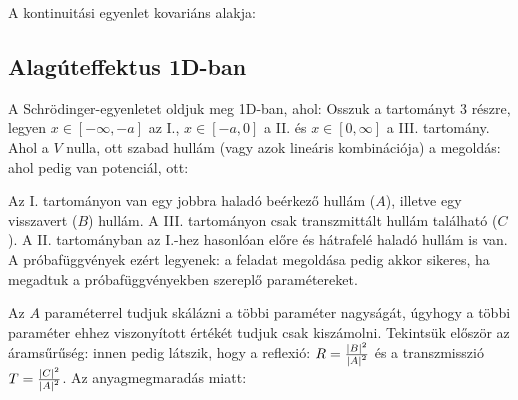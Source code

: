     A kontinuitási egyenlet kovariáns alakja: 
    
  \subsection{Alagúteffektus 1D-ban}
   
   A Schrödinger-egyenletet oldjuk meg 1D-ban, ahol: 
   Osszuk a tartományt 3 részre, legyen $x\in[-\infty,-a]$ az I., $x\in[-a,0]$ a II. és $x\in[0,\infty]$ a III. tartomány. Ahol a $V$ nulla, ott szabad hullám (vagy azok lineáris kombinációja) a megoldás:
   ahol pedig van potenciál, ott:
   
   Az I. tartományon van egy jobbra haladó beérkező hullám ($A$), illetve egy visszavert ($B$) hullám. A III. tartományon csak transzmittált hullám található ($C$). A II. tartományban az I.-hez hasonlóan előre és hátrafelé haladó hullám is van. A próbafüggvények ezért legyenek:
   a feladat megoldása pedig akkor sikeres, ha megadtuk a próbafüggvényekben szereplő paramétereket. 
   
   Az $A$ paraméterrel tudjuk skálázni a többi paraméter nagyságát, úgyhogy a többi paraméter ehhez viszonyított értékét tudjuk csak kiszámolni. Tekintsük először az áramsűrűség:
   innen pedig látszik, hogy a reflexió: $R=\frac{\left\lvert B\right\rvert^2}{\left\lvert A\right\rvert^2}$ és a transzmisszió $T=\frac{\left\lvert C\right\rvert^2}{\left\lvert A\right\rvert^2}$. Az anyagmegmaradás miatt:
   
